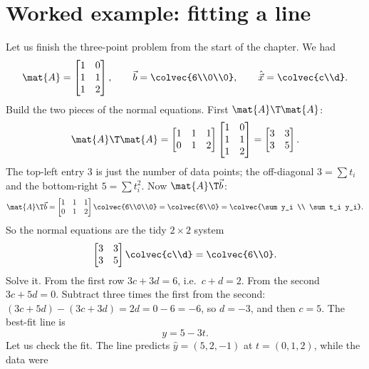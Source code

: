\section{Worked example: fitting a line}

Let us finish the three-point problem from the start of the chapter. We had
\[
  \mat{A}=\begin{bmatrix} 1 & 0\\ 1 & 1\\ 1 & 2\end{bmatrix},
  \qquad
  \vec{b}=\colvec{6\\0\\0},
  \qquad
  \hat{\vec{x}}=\colvec{c\\d}.
\]
Build the two pieces of the normal equations. First $\mat{A}\T\mat{A}$:
\[
  \mat{A}\T\mat{A}
  = \begin{bmatrix} 1&1&1\\ 0&1&2\end{bmatrix}
    \begin{bmatrix} 1&0\\ 1&1\\ 1&2\end{bmatrix}
  = \begin{bmatrix} 3 & 3\\ 3 & 5\end{bmatrix}.
\]
The top-left entry $3$ is just the number of data points; the off-diagonal $3=\sum t_i$ and the
bottom-right $5=\sum t_i^2$. Now $\mat{A}\T\vec{b}$:
\[
  \mat{A}\T\vec{b}
  = \begin{bmatrix} 1&1&1\\ 0&1&2\end{bmatrix}\colvec{6\\0\\0}
  = \colvec{6\\0}
  = \colvec{\sum y_i \\ \sum t_i y_i}.
\]
So the normal equations are the tidy $2\times 2$ system
\[
  \begin{bmatrix} 3 & 3\\ 3 & 5\end{bmatrix}\colvec{c\\d} = \colvec{6\\0}.
\]
Solve it. From the first row $3c+3d=6$, i.e.\ $c+d=2$. From the second $3c+5d=0$. Subtract three
times the first from the second: $(3c+5d)-(3c+3d)=2d=0-6=-6$, so $d=-3$, and then $c=5$. The
best-fit line is
\[
  \boxed{\,y = 5 - 3t.\,}
\]
Let us check the fit. The line predicts $\hat{y}=(5,2,-1)$ at $t=(0,1,2)$, while the data were
